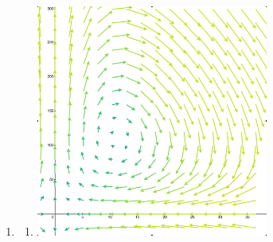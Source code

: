		\begin{enumerate}
			\item \begin{enumerate}
				\item \phantom{x}
				
				\includegraphics[width=3in]{resources/tutorial-02-1a.png}


\end{enumerate}
\end{enumerate}
